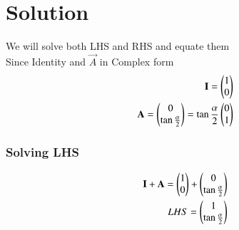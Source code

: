 \documentclass[journal,12pt,onecolumn]{IEEEtran}
\begin{document}
\section{\textbf{Solution}}
We will solve both LHS and RHS and equate them\\
Since Identity and $\vec{A}$ in Complex form 
\begin{align}
    \vec{I}=\myvec{1\\0}
   \\ \Vec{A}=\myvec{0\\\tan\frac{\alpha}{2}}=\tan\frac{\alpha}{2}\myvec{0\\1}
    \end{align}

\subsubsection{Solving LHS}
\begin{align}
 \Vec{I}+\Vec{A}=\myvec{1\\0}+\myvec{0 \\ \tan\frac{\alpha}{2}}\\
 LHS=\myvec{1 \\ \tan\frac{\alpha}{2}  }
\end{align}
\end{document}
